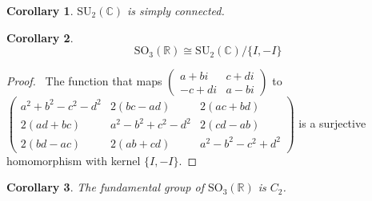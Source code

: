 \documentclass{book}
\let\qed\relax
\newtheorem{cor}{Corollary}[prop]
\theoremstyle{definition}
\begin{document}
\begin{cor}
$\mathrm{SU}_2(\mathbb{C})$ is simply connected.
\end{cor}


\begin{cor}
\[ \mathrm{SO}_3(\mathbb{R}) \cong \mathrm{SU}_2(\mathbb{C}) / \{ I, -I \} \]
\end{cor}

\begin{proof}
\pf\ The function that maps $\left( \begin{array}{cc}
a + b i & c + d i \\
-c + di & a - bi
\end{array} \right)$ to $\left( \begin{array}{ccc}
a^2 + b^2 - c^2 - d^2 & 2(bc - ad) & 2(ac + bd) \\
2(ad + bc) & a^2 - b^2 + c^2 - d^2 & 2(cd - ab) \\
2(bd - ac) & 2(ab + cd) & a^2 - b^2 - c^2 + d^2
\end{array} \right)$ is a surjective homomorphism with kernel $\{ I, -I \}$. \qed
\end{proof}

\begin{cor}
The fundamental group of $\mathrm{SO}_3(\mathbb{R})$ is $C_2$.
\end{cor}

\end{document}
